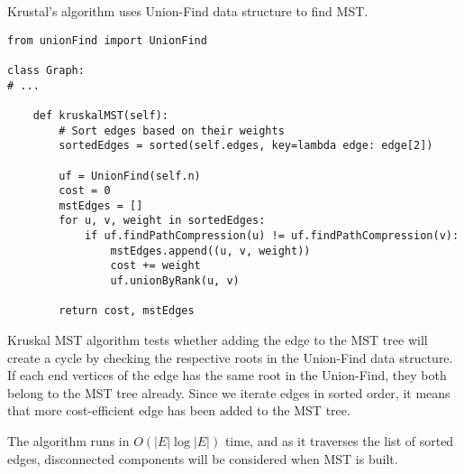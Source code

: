 Krustal's algorithm uses Union-Find data structure to find MST.

\begin{verbatim}
from unionFind import UnionFind

class Graph:
# ...

    def kruskalMST(self):
        # Sort edges based on their weights
        sortedEdges = sorted(self.edges, key=lambda edge: edge[2])

        uf = UnionFind(self.n)
        cost = 0
        mstEdges = []
        for u, v, weight in sortedEdges:
            if uf.findPathCompression(u) != uf.findPathCompression(v):
                mstEdges.append((u, v, weight))
                cost += weight
                uf.unionByRank(u, v)

        return cost, mstEdges
\end{verbatim}

\noindent Kruskal MST algorithm tests whether adding the edge to the MST tree will create a cycle by checking the respective roots in the Union-Find data structure.
If each end vertices of the edge has the same root in the Union-Find, they both belong to the MST tree already.
Since we iterate edges in sorted order, it means that more cost-efficient edge has been added to the MST tree.

\noindent The algorithm runs in $O(|E| \log |E|)$ time, and as it traverses the list of sorted edges, disconnected components will be considered when MST is built.

